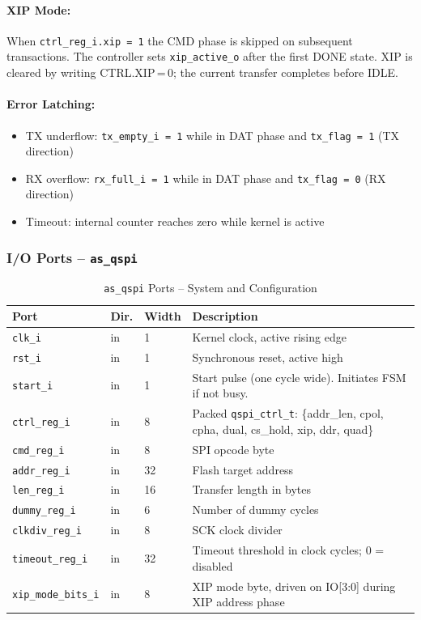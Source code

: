\paragraph{XIP Mode:}
When \texttt{ctrl\_reg\_i.xip = 1} the CMD phase is skipped on subsequent
transactions. The controller sets \texttt{xip\_active\_o} after the first
DONE state. XIP is cleared by writing CTRL.XIP\,=\,0; the current transfer
completes before IDLE.

\paragraph{Error Latching:}
\begin{itemize}
  \item TX underflow: \texttt{tx\_empty\_i = 1} while in DAT phase and
    \texttt{tx\_flag = 1} (TX direction)
  \item RX overflow: \texttt{rx\_full\_i = 1} while in DAT phase and
    \texttt{tx\_flag = 0} (RX direction)
  \item Timeout: internal counter reaches zero while kernel is active
\end{itemize}

\subsubsection{I/O Ports -- \texttt{as\_qspi}}

\begin{table}[H]
\caption{\texttt{as\_qspi} Ports -- System and Configuration}
\label{tab:asqspi_ports1}
\centering
\begin{tabularx}{\textwidth}{|l|l|l|X|}
  \hline
  Port & Dir. & Width & Description \\
  \hline\hline
  \texttt{clk\_i}           & in  & 1  & Kernel clock, active rising edge \\
  \hline
  \texttt{rst\_i}           & in  & 1  & Synchronous reset, active high \\
  \hline
  \texttt{start\_i}         & in  & 1  & Start pulse (one cycle wide). Initiates FSM if not busy. \\
  \hline
  \texttt{ctrl\_reg\_i}     & in  & 8  & Packed \texttt{qspi\_ctrl\_t}: \{addr\_len, cpol, cpha, dual, cs\_hold, xip, ddr, quad\} \\
  \hline
  \texttt{cmd\_reg\_i}      & in  & 8  & SPI opcode byte \\
  \hline
  \texttt{addr\_reg\_i}     & in  & 32 & Flash target address \\
  \hline
  \texttt{len\_reg\_i}      & in  & 16 & Transfer length in bytes \\
  \hline
  \texttt{dummy\_reg\_i}    & in  & 6  & Number of dummy cycles \\
  \hline
  \texttt{clkdiv\_reg\_i}   & in  & 8  & SCK clock divider \\
  \hline
  \texttt{timeout\_reg\_i}  & in  & 32 & Timeout threshold in clock cycles; 0 = disabled \\
  \hline
  \texttt{xip\_mode\_bits\_i}& in & 8  & XIP mode byte, driven on IO[3:0] during XIP address phase \\
  \hline
\end{tabularx}
\end{table}

